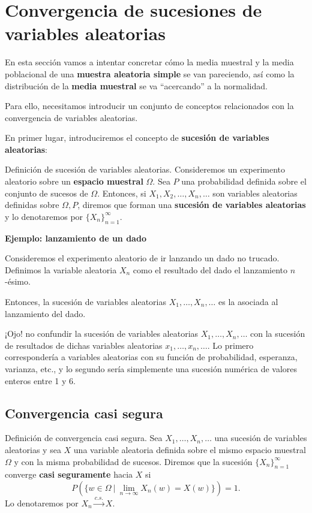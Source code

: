 \documentclass[
  letterpaper,
  DIV=11,
  numbers=noendperiod]{scrreprt}
\begin{document}
\hypertarget{convergencia-de-sucesiones-de-variables-aleatorias}{%
\section{Convergencia de sucesiones de variables
aleatorias}\label{convergencia-de-sucesiones-de-variables-aleatorias}}

En esta sección vamos a intentar concretar cómo la media muestral y la
media poblacional de una \textbf{muestra aleatoria simple} se van
pareciendo, así como la distribución de la \textbf{media muestral} se va
``acercando'' a la normalidad.

Para ello, necesitamos introducir un conjunto de conceptos relacionados
con la convergencia de variables aleatorias.

En primer lugar, introduciremos el concepto de \textbf{sucesión de
variables aleatorias}:

Definición de sucesión de variables aleatorias. Consideremos un
experimento aleatorio sobre un \textbf{espacio muestral} \(\Omega\). Sea
\(P\) una probabilidad definida sobre el conjunto de sucesos de
\(\Omega\). Entonces, si \(X_1,X_2,\ldots,X_n,\ldots\) son variables
aleatorias definidas sobre \(\Omega,P\), diremos que forman una
\textbf{sucesión de variables aleatorias} y lo denotaremos por
\(\{X_n\}_{n=1}^\infty\).

\textbf{Ejemplo: lanzamiento de un dado}

Consideremos el experimento aleatorio de ir lanzando un dado no trucado.
Definimos la variable aleatoria \(X_n\) como el resultado del dado el
lanzamiento \(n\)-ésimo.

Entonces, la sucesión de variables aleatorias \(X_1,\ldots,X_n,\ldots\)
es la asociada al lanzamiento del dado.

¡Ojo! no confundir la sucesión de variables aleatorias
\(X_1,\ldots,X_n,\ldots\) con la sucesión de resultados de dichas
variables aleatorias \(x_1,\ldots, x_n,\ldots\). Lo primero
correspondería a variables aleatorias con su función de probabilidad,
esperanza, varianza, etc., y lo segundo sería simplemente una sucesión
numérica de valores enteros entre 1 y 6.

\hypertarget{convergencia-casi-segura}{%
\subsection{Convergencia casi segura}\label{convergencia-casi-segura}}

Definición de convergencia casi segura. Sea \(X_1,\ldots,X_n,\ldots\)
una sucesión de variables aleatorias y sea \(X\) una variable aleatoria
definida sobre el mismo espacio muestral \(\Omega\) y con la misma
probabilidad de sucesos. Diremos que la sucesión
\(\{X_n\}_{n=1}^\infty\) converge \textbf{casi seguramente} hacia \(X\)
si \[
P\left(\{w\in \Omega\ |\ \lim_{n\to\infty} X_n(w)=X(w)\}\right)=1.
\] Lo denotaremos por \(X_n\stackrel{c.s.}{\longrightarrow}X\).
\end{document}
